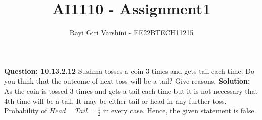 \documentclass[journal,12pt,twocolumn]{IEEEtran}
\begin{document}
\title{AI1110 - Assignment1}
\author{Rayi Giri Varshini - EE22BTECH11215}	
\maketitle
\textbf{Question: 10.13.2.12}
Sushma tosses a coin 3 times and gets tail each time. Do you think that the outcome of next toss will be a tail? Give reasons.
\textbf{Solution:}
As the coin is tossed 3 times and gets a tail each time but it is not necessary that 4th time will be a tail. It may be either tail or head in any
further toss.
 Probability of $Head = Tail = \frac{1}{2} $ in every case.
Hence, the given statement is false.
\end{document}
